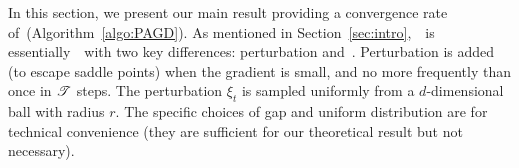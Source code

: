 
In this section, we present our main result providing a convergence rate of~\pagd (Algorithm~\ref{algo:PAGD}). As mentioned in Section~\ref{sec:intro},~\pagd~is essentially~\nag~with two key differences: perturbation and~\nce. Perturbation is added (to escape saddle points) when the gradient is small, and no more frequently than once in $\mathscr{T}$ steps. The perturbation $\xi_t$ is sampled uniformly from a $d$-dimensional ball with radius $r$. The specific choices of gap and uniform distribution are for
technical convenience (they are sufficient for our theoretical result but not necessary).

